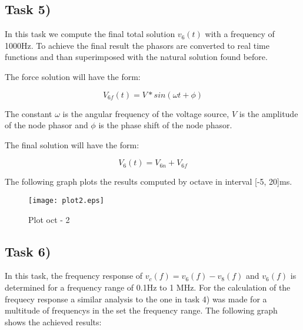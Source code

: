 \subsection{Task 5)}
\label{subsec:task5_a}

In this task we compute the final total solution $v_6(t)$ with a frequency of 1000Hz. To achieve the final result the phasors are converted to real time functions and than superimposed with the natural solution found before.

The force solution will have the form:

\[
V_{6f}(t) = V*sin(\omega t + \phi)
\]

The constant $\omega$ is the angular frequency of the voltage source, $V$ is the amplitude of the node phasor and $\phi$ is the phase shift of the node phasor.

The final solution will have the form:

\[
V_6(t) = V_{6n} + V_{6f}
\]

The following graph plots the results computed by octave in interval [-5, 20]ms.

\begin{figure}[ht]
	\centering
	\texttt{[image: plot2.eps]}
	\caption{Plot oct - 2}
\label{fig:Dsnh_sim_t2}
\end{figure}
\newpage
\subsection{Task 6)}
\label{subsec:task6_a}

In this task, the frequency response of $v_c(f)= v_6(f) - v_8(f)$ and $v_6(f)$ is determined for a frequency range of 0.1Hz to 1 MHz. For the calculation of the frequecy response a similar analysis to the one in task 4) was made for a multitude of frequencys in the set the frequency range. The following graph shows the achieved results: 



